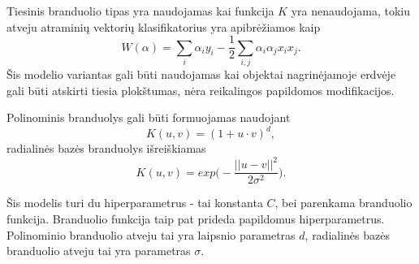 Tiesinis branduolio tipas yra naudojamas kai funkcija $K$ yra nenaudojama, tokiu atveju atraminių vektorių klasifikatorius yra apibrėžiamos kaip
\begin{equation}
    W(\alpha) = \sum_{i}\alpha_i y_i - \frac{1}{2} \sum_{i, j} \alpha_i \alpha_j x_i x_j.
\end{equation}
Šis modelio variantas gali būti naudojamas kai objektai nagrinėjamoje erdvėje gali būti atskirti tiesia plokštumas, nėra reikalingos papildomos modifikacijos.

Polinominis branduolys gali būti formuojamas naudojant \cite{vw}
\begin{equation}
    K(u, v) = (1 + u \cdot v)^d,
\end{equation}
radialinės bazės branduolys išreiškiamas
\begin{equation}
    K(u, v) = exp \big( - \frac{|| u - v ||^2}{2 \sigma ^ 2} \big).
\end{equation}

Šis modelis turi du hiperparametrus - tai konstanta $C$, bei parenkama branduolio funkcija. Branduolio funkcija taip pat prideda papildomus hiperparametrus. Polinominio branduolio atveju tai yra laipsnio parametras $d$, radialinės bazės branduolio atveju tai yra parametras $\sigma$.